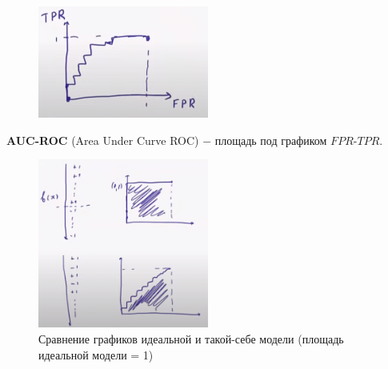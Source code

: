         \begin{figure}[H]
            \centering
            \includegraphics[width=0.5\textwidth]{images/5lecture/TPR_and_FPR_plot.png}
        \end{figure}


        \textbf{AUC-ROC} (Area Under Curve ROC) $-$ площадь под графиком $FPR$-$TPR$.

        \begin{figure}[H]
            \centering
            \includegraphics[width=0.5\textwidth]{images/5lecture/compare_idel_model.png}
            \caption{Сравнение графиков идеальной и такой-себе модели (площадь идеальной модели = 1)}
        \end{figure}

